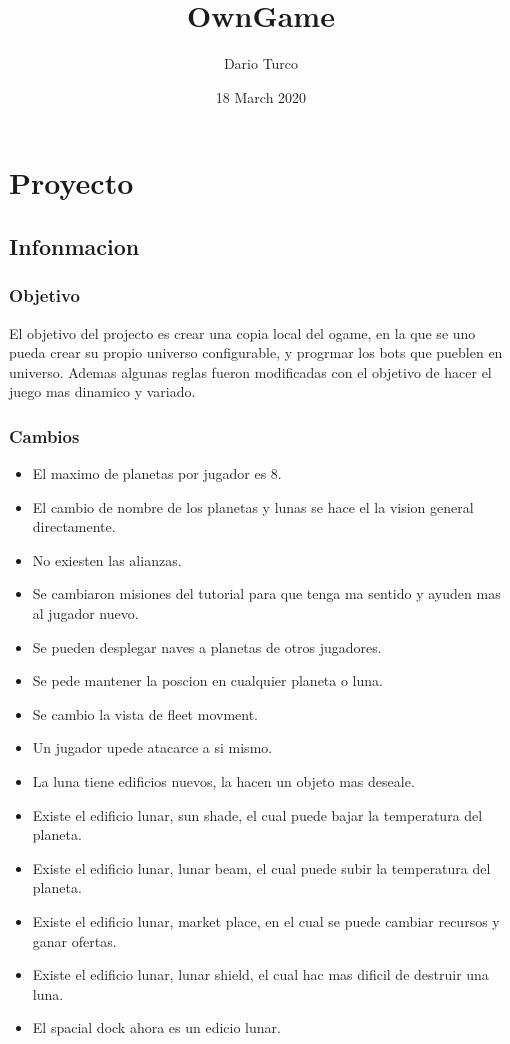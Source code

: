 \documentclass{article}
\title{OwnGame}
\author{Dario Turco}
\date{18 March 2020}
\begin{document}
\section{Proyecto}
    \subsection{Infonmacion}
        \subsubsection{Objetivo}
        El objetivo del projecto es crear una copia local del ogame, en la que se uno pueda crear su propio universo configurable, y progrmar los bots que pueblen en universo. Ademas algunas reglas fueron modificadas con el objetivo de hacer el juego mas dinamico y variado.
        \subsubsection{Cambios}
        \begin{itemize}
            \item El maximo de planetas por jugador es 8.
            \item El cambio de nombre de los planetas y lunas se hace el la vision general directamente.
            \item No exiesten las alianzas.
            \item Se cambiaron misiones del tutorial para que tenga ma sentido y ayuden mas al jugador nuevo.
            \item Se pueden desplegar naves a planetas de otros jugadores.
            \item Se pede mantener la poscion en cualquier planeta o luna.
            \item Se cambio la vista de fleet movment.
            \item Un jugador upede atacarce a si mismo.
            \item La luna tiene edificios nuevos, la hacen un objeto mas deseale.
            \item Existe el edificio lunar, sun shade, el cual puede bajar la temperatura del planeta.
            \item Existe el edificio lunar, lunar beam, el cual puede subir la temperatura del planeta.
            \item Existe el edificio lunar, market place, en el cual se puede cambiar recursos y ganar ofertas.
            \item Existe el edificio lunar, lunar shield, el cual hac mas dificil de destruir una luna.
            \item El spacial dock ahora es un edicio lunar.
        \end{itemize}
\end{document}
